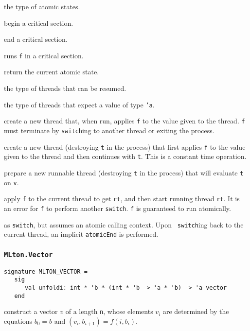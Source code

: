\begin{description}

the type of atomic states.

begin a critical section.

end a critical section.

runs {\tt f} in a critical section.

return the current atomic state.

the type of threads that can be resumed.

the type of threads that expect a value of type {\tt 'a}.

create a new thread that, when run, applies {\tt f} to the value given
to the thread.  {\tt f} must terminate by {\tt switch}ing to another
thread or exiting the process.

create a new thread (destroying {\tt t} in the process) that first
applies {\tt f} to the value given to the thread and then continues
with {\tt t}.  This is a constant time operation.

prepare a new runnable thread (destroying {\tt t} in the process)
that will evaluate {\tt t} on {\tt v}.

apply {\tt f} to the current thread to get {\tt rt}, and then start
running thread {\tt rt}.  It is an error for {\tt f} to
perform another {\tt switch}.  {\tt f} is guaranteed to run
atomically.

as {\tt switch}, but assumes an atomic calling context.  Upon {\tt
switch}ing back to the current thread, an implicit {\tt atomicEnd} is
performed.

\end{description}
%
\subsubsection{\tt MLton.Vector}

\begin{verbatim}
signature MLTON_VECTOR =
   sig
      val unfoldi: int * 'b * (int * 'b -> 'a * 'b) -> 'a vector
   end
\end{verbatim}

\begin{description}

construct a vector $v$ of a length {\tt n}, whose elements $v_i$ are determined
by the equations $b_0 = b$ and $(v_i, b_{i+1}) = f (i, b_i)$.

\end{description}

